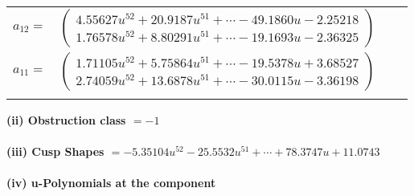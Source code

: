 \documentclass[1p]{elsarticle_modified}
\theoremstyle{definition}
\begin{document}
\begin{tabular}{m{7pt} m{180pt} m{7pt} m{180pt} }
\flushright $a_{12}=$&$\begin{pmatrix}4.55627 u^{52}+20.9187 u^{51}+\cdots-49.1860 u-2.25218\\1.76578 u^{52}+8.80291 u^{51}+\cdots-19.1693 u-2.36325\end{pmatrix}$ \\
\flushright $a_{11}=$&$\begin{pmatrix}1.71105 u^{52}+5.75864 u^{51}+\cdots-19.5378 u+3.68527\\2.74059 u^{52}+13.6878 u^{51}+\cdots-30.0115 u-3.36198\end{pmatrix}$\\&\end{tabular}
\flushleft \textbf{(ii) Obstruction class $= -1$}\\~\\
\flushleft \textbf{(iii) Cusp Shapes $= -5.35104 u^{52}-25.5532 u^{51}+\cdots+78.3747 u+11.0743$}\\~\\
\newpage\renewcommand{\arraystretch}{1}
\flushleft \textbf{(iv) u-Polynomials at the component}\newline \\
\end{document}

